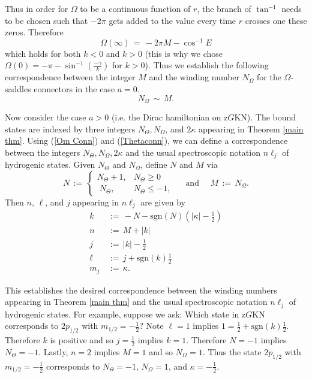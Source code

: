 \documentclass[11 pt]{article}
\newcommand\Om{\Omega}
\renewcommand\({\left(}
\renewcommand\){\right)}
\renewcommand\Om{\Omega}
\newcommand\<{\langle}
\renewcommand\>{\rangle}
\newcommand\8{\infty}
\newcommand\beq{\begin{equation}}
\newcommand\eeq{\end{equation}}
\newcommand{\ga} {\gamma}\newcommand{\Ga}{\Gamma}
\newcommand{\half}{\frac{1}{2}}
\newcommand{\sgn}{\mbox{sgn}}
\begin{document}
Thus in order for $\Om$ to be a continuous function of $r$, the branch of $\tan^{-1}$ needs to be chosen such that $-2\pi $ gets added to the value every time $r$ crosses one these zeros. Therefore
\begin{equation}
\Omega(\infty) \,=\, -2\pi M - \cos^{-1}E
\end{equation}
which holds for both $k < 0$ and $k > 0$ (this is why we chose $\Omega(0) = -\pi - \sin^{-1}(\frac{-\ga}{k})$ for $k > 0$). Thus we establish the following correspondence between the integer $M$ and the winding number $N_\Omega$ for the $\Omega$-saddles connectors in the case $a = 0$. 
\beq\label{Om Conn}
N_\Omega \,\sim\, M. 
\eeq

Now consider the case $a > 0$ (i.e. the Dirac hamiltonian on z$G$KN). The bound states are indexed by three integers $N_\Theta, N_\Omega$, and $2\kappa$ appearing in Theorem \ref{main thm}. Using (\ref{Om Conn}) and (\ref{Thetaconn}), we can define a correspondence between the integers $N_\Theta, N_\Omega, 2\kappa$ and the usual spectroscopic notation $n\ell_j$ of hydrogenic states. Given $N_\Theta$ and $N_\Omega$, define $N$ and $M$ via  
\beq
N \,:=\,
\left\{\begin{array}{cc} N_\Theta + 1, & N_\Theta \geq 0 
\\ 
\; N_\Theta,\; & N_\Theta \leq -1, \end{array}\right. \quad \text{ and } \quad M \,:=\, N_\Omega. 
\eeq
Then $n$, $\ell$, and $j$ appearing in $n\ell_j$ are given by 
\begin{align}
k \,&:=\, -N - \sgn(N)\left(|\kappa| - \half\right)
\\
n\,&:=\, M + |k|
\\
j\,&:=\, |k| - \half
\\
\ell \,&:=\, j + \sgn(k)\half
\\
m_j \,&:=\, \kappa. 
\end{align}

This establishes the desired correspondence between the winding numbers appearing in Theorem \ref{main thm} and the usual spectroscopic notation $n \ell_j$ of hydrogenic states. For example, suppose we ask: Which state in z$G$KN corresponds to $2p_{1/2}$ with $m_{1/2} = -\half$? Note $\ell = 1$ implies $1 = \half + \sgn(k)\half$. Therefore $k$ is positive and so $j = \half$ implies $k = 1$. Therefore $N = -1$ implies $N_\Theta = -1$. Lastly, $n = 2$ implies $M = 1$ and so $N_\Omega = 1$. Thus  the state $2p_{1/2}$ with $m_{1/2} = - \half$ corresponds to $N_\Theta = -1$, $N_\Omega = 1$, and $\kappa = -\half$. 
\end{document}
